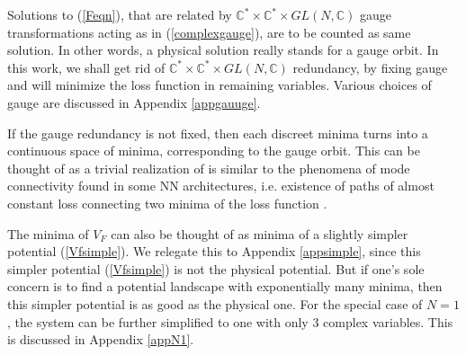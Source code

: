 \documentclass[12pt,a4paper]{JHEP3}
\newcommand{\refb}[1]{(\ref{#1})}
\begin{document}
Solutions to \refb{Feqn}, that are related by $ \mathbb{C}^\ast \times  \mathbb{C}^\ast \times  GL(N, \mathbb{C})$ gauge transformations acting as in \refb{complexgauge}, are to be counted as same solution. In other words, a physical solution really stands for a gauge orbit.
In this work, we shall get rid of $ \mathbb{C}^\ast \times  \mathbb{C}^\ast \times  GL(N, \mathbb{C})$ redundancy, by fixing gauge and will minimize the  loss function in remaining variables. Various choices of gauge are discussed in Appendix \ref{appgauuge}.

If the gauge redundancy is not fixed, then each discreet  minima turns into a continuous space of minima, corresponding to the gauge orbit. This can be thought of as a trivial realization of 
is similar to the phenomena of mode connectivity found in some NN architectures, i.e. existence of paths of almost constant loss connecting two minima of the loss function  \cite{garipov2018loss, raghavan2020sparsifying}.


The minima of $V_F$ can also be thought of as minima of a slightly simpler potential \refb{Vfsimple}. We relegate this to Appendix \ref{appsimple}, since this simpler potential  \refb{Vfsimple} is not the physical potential. But if one's sole concern is to find a potential landscape with exponentially many minima, then this simpler potential is as good as  the physical one. For the special  case of $N=1$, the system can be further simplified to one with only 3 complex variables. This is discussed in Appendix \ref{appN1}.
\end{document}
